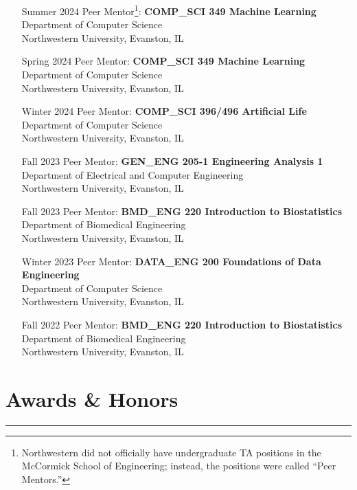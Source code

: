 \documentclass{article}
\begin{document}
\begin{itemize}[leftmargin=1.5in]
    \item[Summer 2024] Peer Mentor\footnote{Northwestern did not officially have undergraduate TA positions in the McCormick School of Engineering; instead, the positions were called ``Peer Mentors.''}: \textbf{COMP\_SCI 349 Machine Learning}\\
    Department of Computer Science\\
    Northwestern University, Evanston, IL
    \item[Spring 2024] Peer Mentor: \textbf{COMP\_SCI 349 Machine Learning}\\
    Department of Computer Science\\
    Northwestern University, Evanston, IL
    \item[Winter 2024] Peer Mentor: \textbf{COMP\_SCI 396/496 Artificial Life}\\
    Department of Computer Science\\
    Northwestern University, Evanston, IL
    \item[Fall 2023] Peer Mentor: \textbf{GEN\_ENG 205-1 Engineering Analysis 1}\\
    Department of Electrical and Computer Engineering\\
    Northwestern University, Evanston, IL
    \item[Fall 2023] Peer Mentor: \textbf{BMD\_ENG 220 Introduction to Biostatistics}\\
    Department of Biomedical Engineering\\
    Northwestern University, Evanston, IL
    \item[Winter 2023] Peer Mentor: \textbf{DATA\_ENG 200 Foundations of Data Engineering}\\
    Department of Computer Science\\
    Northwestern University, Evanston, IL
    \item[Fall 2022] Peer Mentor: \textbf{BMD\_ENG 220 Introduction to Biostatistics}\\
    Department of Biomedical Engineering\\
    Northwestern University, Evanston, IL
\end{itemize}

\section*{Awards \& Honors}
\hrule
\vspace{10pt}
\end{document}
